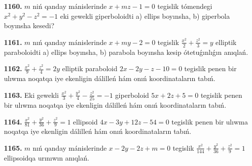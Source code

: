 \textbf{1160.} $m$ niń qanday mánislerinde $x+mz-1=0$ tegislik tómendegi $x^2+y^2−z^2=−1$ eki gewekli giperboloidti a) ellips boyınsha, b) giperbola boyınsha kesedi?

\textbf{1161.} $m$ nıń qanday mánislerinde $x+m y-2=0$ tegislik $\frac{x^2}{2}+\frac{z^2}{3}=y$ elliptik paraboloidti a) ellips boyınsha, b) parabola boyınsha kesip ótetuǵınlıǵın anıqlań.

\textbf{1162.} $\frac{x^2}{9}+\frac{z^2}{4}=2 y$ elliptik paraboloid $2 x-2 y-z-10=0$ tegislik penen bir ulıwma noqatqa iye ekenligin dálilleń hám onıń koordinataların tabıń.

\textbf{1163.} Eki gewekli $\frac{x^2}{3}+\frac{y^2}{4}-\frac{z^2}{25}=-1$ giperboloid $5 x+2 z+5=0$ tegislik penen bir ulıwma noqatqa iye ekenligin dálilleń hám onıń koordinataların tabıń.

\textbf{1164.} $\frac{x^2}{81}+\frac{y^2}{36}+\frac{z^2}{9}=1$ ellipsoid $4 x-3 y+12 z-54=0$ tegislik penen bir ulıwma noqatqa iye ekenligin dálilleń hám onıń koordinataların tabıń.

\textbf{1165.} $m$ nıń qanday mánislerinde $x-2 y-2 z+m=0$ tegislik $\frac{x^2}{144}+\frac{y^2}{36}+\frac{z^2}{9}=1$ ellipsoidqa urınıwın anıqlań.

